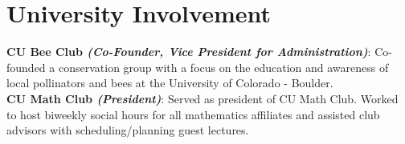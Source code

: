 \documentclass[letterpaper,11pt]{article}
\makeatletter
\newcommand{\resumeItem}[1]{
  \item\small{
    {#1 \vspace{-2pt}}
  }
}
\newcommand{\resumeProjectHeading}[2]{
    \item
    \begin{tabular*}{0.97\textwidth}{l@{\extracolsep{\fill}}r}
      \small#1 & #2 \\
    \end{tabular*}\vspace{-7pt}
}
\newcommand{\resumeSubHeadingListStart}{\begin{itemize}[leftmargin=0.15in, label={}]}
\newcommand{\resumeSubHeadingListEnd}{\end{itemize}}
\newcommand{\resumeItemListStart}{\begin{itemize}}
\newcommand{\resumeItemListEnd}{\end{itemize}\vspace{-5pt}}
\makeatother
\begin{document}
\section{University Involvement}
 \begin{itemize}[leftmargin=0.15in, label={}]
    \small{\item{
     \textbf{CU Bee Club \textit{(Co-Founder, Vice President for Administration)}}{: Co-founded a conservation group with a focus on the education and awareness of local pollinators and bees at the University of Colorado - Boulder.} \\
     \textbf{CU Math Club \textit{(President)}}{: Served as president of CU Math Club.  Worked to host biweekly social hours for all mathematics affiliates and assisted club advisors with scheduling/planning guest lectures.}
    }}
 \end{itemize}

\end{document}
